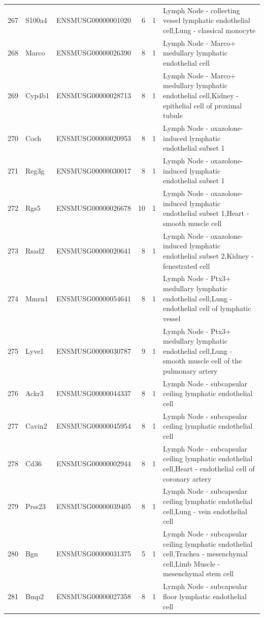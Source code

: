\begin{table}[ht]
{\begin{tabular}{lllrrl}
        267 & S100a4 & ENSMUSG00000001020 & 6 & 1 & Lymph Node - collecting vessel lymphatic endothelial cell,Lung - classical monocyte \\
        268 & Marco & ENSMUSG00000026390 & 8 & 1 & Lymph Node - Marco+ medullary lymphatic endothelial cell \\
        269 & Cyp4b1 & ENSMUSG00000028713 & 8 & 1 & Lymph Node - Marco+ medullary lymphatic endothelial cell,Kidney - epithelial cell of proximal tubule \\
        270 & Coch & ENSMUSG00000020953 & 8 & 1 & Lymph Node - oxazolone-induced lymphatic endothelial subset 1 \\
        271 & Reg3g & ENSMUSG00000030017 & 8 & 1 & Lymph Node - oxazolone-induced lymphatic endothelial subset 1 \\
        272 & Rgs5 & ENSMUSG00000026678 & 10 & 1 & Lymph Node - oxazolone-induced lymphatic endothelial subset 1,Heart - smooth muscle cell \\
        273 & Rsad2 & ENSMUSG00000020641 & 8 & 1 & Lymph Node - oxazolone-induced lymphatic endothelial subset 2,Kidney - fenestrated cell \\
        274 & Mmrn1 & ENSMUSG00000054641 & 8 & 1 & Lymph Node - Ptx3+ medullary lymphatic endothelial cell,Lung - endothelial cell of lymphatic vessel \\
        275 & Lyve1 & ENSMUSG00000030787 & 9 & 1 & Lymph Node - Ptx3+ medullary lymphatic endothelial cell,Lung - smooth muscle cell of the pulmonary artery \\
        276 & Ackr3 & ENSMUSG00000044337 & 8 & 1 & Lymph Node - subcapsular ceiling lymphatic endothelial cell \\
        277 & Cavin2 & ENSMUSG00000045954 & 8 & 1 & Lymph Node - subcapsular ceiling lymphatic endothelial cell \\
        278 & Cd36 & ENSMUSG00000002944 & 8 & 1 & Lymph Node - subcapsular ceiling lymphatic endothelial cell,Heart - endothelial cell of coronary artery \\
        279 & Prss23 & ENSMUSG00000039405 & 8 & 1 & Lymph Node - subcapsular ceiling lymphatic endothelial cell,Lung - vein endothelial cell \\
        280 & Bgn & ENSMUSG00000031375 & 5 & 1 & Lymph Node - subcapsular ceiling lymphatic endothelial cell,Trachea - mesenchymal cell,Limb Muscle - mesenchymal stem cell \\
        281 & Bmp2 & ENSMUSG00000027358 & 8 & 1 & Lymph Node - subcapsular floor lymphatic endothelial cell \\

\end{tabular}}
\end{table}
